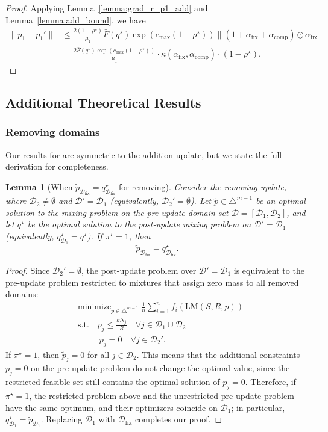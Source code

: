 \documentclass[table]{ai2style/ai2}
\newtheorem{lemma}{Lemma}
\newcommand{\D}[0]{\mathcal{D}}
\newcommand{\LM}[0]{\text{LM}}
\newcommand{\Dfix}[0]{\mathcal{D}_{\text{fix}}}
\newcommand{\alphafix}[0]{\alpha_{\text{fix}}}
\newcommand{\alphacomp}[0]{\alpha_{\text{comp}}}
\begin{document}
\begin{proof}
    Applying Lemma~\ref{lemma:grad_r_p1_add} and Lemma~\ref{lemma:add_bound}, we have
    \begin{align*}
        \| p_1 - p_1' \| &\le \frac{2(1 - \rho^\star)}{\mu_1} \bar{F}(q^\star) \exp( c_{\max}(1 - \rho^\star)) \|(1 + \alphafix + \alphacomp) \odot \alphafix \| \\
        &= \frac{2\bar{F}(q^\star) \exp( c_{\max}(1 - \rho^\star))}{\mu_1}   \cdot \kappa(\alphafix, \alphacomp) \cdot (1 - \rho^\star).
    \end{align*}
\end{proof}

\subsection{Additional Theoretical Results}

\subsubsection{Removing domains}

Our results for are symmetric to the addition update, but we state the full derivation for completeness.

\begin{lemma}[When $\tilde{p}_{\Dfix} = q^\star_{\Dfix}$ for removing]\label{lem:rem_exactness}
Consider the \emph{removing} update, where $\D_2\neq\emptyset$ and $\D'=\D_1$ (equivalently, $\D_2'=\emptyset$).
Let $\tilde p\in\triangle^{m-1}$ be an optimal solution to the mixing problem on the pre-update domain set $\D=[\D_1,\D_2]$, and let $q^\star$ be the optimal solution to the post-update mixing problem on $\D'=\D_1$ (equivalently, $q^\star_{\D_1}=q^\star$).
If $\pi^\star=1$, then
\[
\tilde p_{\Dfix} = q^\star_{\Dfix}.
\]
\end{lemma}

\begin{proof}
Since $\D_2'=\emptyset$, the post-update problem over $\D'=\D_1$ is equivalent to the pre-update problem restricted to mixtures that assign zero mass to all removed domains:
\begin{align*}
    &\text{minimize}_{p\in\triangle^{m-1}} \; \frac{1}{n} \sum_{i = 1}^n f_i(\LM(S, R, p)) \\
    &\text{s.t.}\quad p_j \le \frac{kN_j}{R}\quad \forall j\in\D_1\cup\D_2 \\
    &\qquad\;\; p_j = 0 \quad \forall j\in\D_2'.
\end{align*}
If $\pi^\star=1$, then $\tilde p_j=0$ for all $j\in\D_2$. This means that the additional constraints $p_j=0$ on the pre-update problem do not change the optimal value, since the restricted feasible set still contains the optimal solution of $\tilde p_j = 0$. Therefore, if $\pi^\star = 1$, the restricted problem above and the unrestricted pre-update problem have the same optimum, and their optimizers coincide on $\D_1$; in particular, $q^\star_{\D_1}=\tilde p_{\D_1}$. Replacing $\D_1$ with $\Dfix$ completes our proof.
\end{proof}
\end{document}
